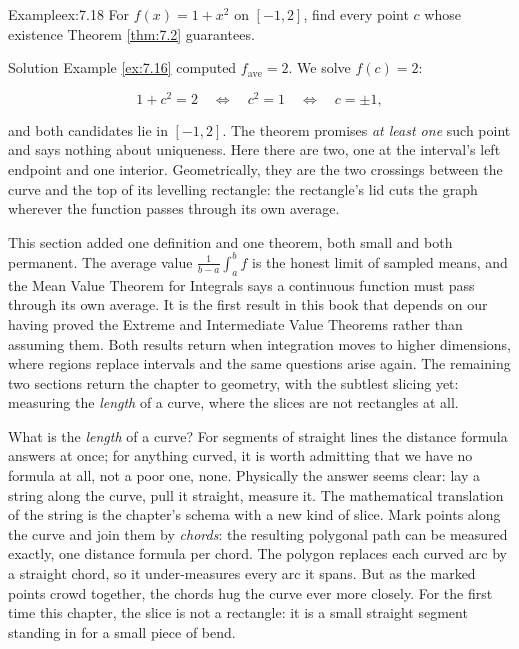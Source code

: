 \documentclass[a4paper,12pt,oneside]{memoir}
\begin{document}
\begin{workedexample}
\begin{envexample}{Example}{ex:7.18}{}
For \(f(x) = 1 + x^{2}\) on \([-1, 2]\), find every point \(c\) whose existence Theorem \ref{thm:7.2} guarantees.
\end{envexample}
\begin{envsolution}{Solution}{}{}
Example \ref{ex:7.16} computed \(f_{\text{ave}} = 2\). We solve \(f(c) = 2\):

\[ 1 + c^{2} = 2 \quad\Longleftrightarrow\quad c^{2} = 1 \quad\Longleftrightarrow\quad c = \pm 1, \]

and both candidates lie in \([-1, 2]\). The theorem promises \emph{at least one} such point and says nothing about uniqueness. Here there are two, one at the interval’s left endpoint and one interior. Geometrically, they are the two crossings between the curve and the top of its levelling rectangle: the rectangle’s lid cuts the graph wherever the function passes through its own average. \qedmark
\end{envsolution}
\end{workedexample}
This section added one definition and one theorem, both small and both permanent. The average value \(\tfrac{1}{b-a}\int_a^b f\) is the honest limit of sampled means, and the Mean Value Theorem for Integrals says a continuous function must pass through its own average. It is the first result in this book that depends on our having proved the Extreme and Intermediate Value Theorems rather than assuming them. Both results return when integration moves to higher dimensions, where regions replace intervals and the same questions arise again. The remaining two sections return the chapter to geometry, with the subtlest slicing yet: measuring the \emph{length} of a curve, where the slices are not rectangles at all.


What is the \emph{length} of a curve? For segments of straight lines the distance formula answers at once; for anything curved, it is worth admitting that we have no formula at all, not a poor one, none. Physically the answer seems clear: lay a string along the curve, pull it straight, measure it. The mathematical translation of the string is the chapter’s schema with a new kind of slice. Mark points along the curve and join them by \emph{chords}: the resulting polygonal path can be measured exactly, one distance formula per chord. The polygon replaces each curved arc by a straight chord, so it under-measures every arc it spans. But as the marked points crowd together, the chords hug the curve ever more closely. For the first time this chapter, the slice is not a rectangle: it is a small straight segment standing in for a small piece of bend.
\end{document}
